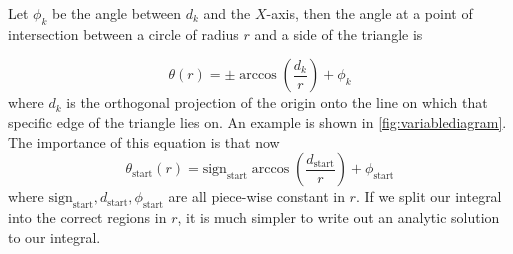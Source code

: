 \documentclass[../paper.tex]{subfiles}
\begin{document}
Let $\phi_k$ be the angle between $d_k$ and the $X$-axis, then the angle at a point of intersection between a circle of radius $r$ and a side of the triangle is 

\begin{equation}\label{equation for boundary theta}
    \theta(r) = \pm\arccos\left(\frac{d_k}{r}\right) + \phi_k
\end{equation}
where $d_k$ is the orthogonal projection of the origin onto the line on which that specific edge of the triangle lies on. An example is shown in \autoref{fig:variablediagram}. 
The importance of this equation is that now 
\begin{equation*}
    \theta_\mathrm{start}(r) = \mathrm{sign}_\mathrm{start}\arccos\left(\frac{d_\mathrm{start}}{r}\right) + \phi_\mathrm{start} 
\end{equation*}
where $\mathrm{sign}_\mathrm{start}, d_\mathrm{start}, \phi_\mathrm{start}$ are all piece-wise constant in $r$. 
If we split our integral into the correct regions in $r$, it is much simpler to write out an analytic solution to our integral. 
\end{document}

